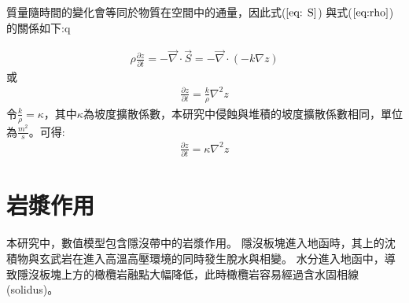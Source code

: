 質量隨時間的變化會等同於物質在空間中的通量，因此式($\ref{eq: S}$) 與式($\ref{eq:rho}$) 的關係如下:q 

\begin{align}
\rho\frac{\partial z}{\partial t} = -\vec\nabla\cdot \vec S = -\vec\nabla \cdot (-k\nabla z)\label{eq:erosion2}
\end{align}
或
\begin{align}
\frac{\partial z}{\partial t} = \frac{k}{\rho}\nabla^2 z\label{eq:erosion3}
\end{align}
令$\frac{k}{\rho}=\kappa$，其中$\kappa$為坡度擴散係數，本研究中侵蝕與堆積的坡度擴散係數相同，單位為$\frac{m^2}{s}$。可得:
\begin{align}
\frac{\partial z}{\partial t} = \kappa\nabla^2 z\label{eq:erosion4}
\end{align}

\section{岩漿作用}
本研究中，數值模型包含隱沒帶中的岩漿作用。
隱沒板塊進入地函時，其上的沈積物與玄武岩在進入高溫高壓環境的同時發生脫水與相變。
水分進入地函中，導致隱沒板塊上方的橄欖岩融點大幅降低，此時橄欖岩容易經過含水固相線(solidus)。
